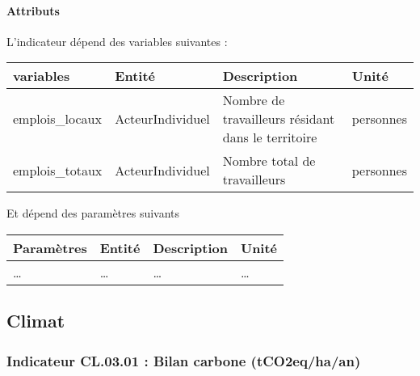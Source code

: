 \documentclass[
]{article}
\begin{document}
\paragraph{Attributs}\label{attributs-38}

L'indicateur dépend des variables suivantes :

\begin{longtable}[]{@{}
  >{\raggedright\arraybackslash}p{}
  >{\raggedright\arraybackslash}p{}
  >{\raggedright\arraybackslash}p{}
  >{\raggedright\arraybackslash}p{}@{}}
\toprule\noalign{}
\begin{minipage}[b]{\linewidth}\raggedright
\textbf{variables}
\end{minipage} & \begin{minipage}[b]{\linewidth}\raggedright
\textbf{Entité}
\end{minipage} & \begin{minipage}[b]{\linewidth}\raggedright
\textbf{Description}
\end{minipage} & \begin{minipage}[b]{\linewidth}\raggedright
\textbf{Unité}
\end{minipage} \\
\midrule\noalign{}
\endhead
\bottomrule\noalign{}
\endlastfoot
emplois\_locaux & ActeurIndividuel & Nombre de travailleurs résidant
dans le territoire & personnes \\
emplois\_totaux & ActeurIndividuel & Nombre total de travailleurs &
personnes \\
\end{longtable}

Et dépend des paramètres suivants

\begin{longtable}[]{@{}llll@{}}
\toprule\noalign{}
\textbf{Paramètres} & \textbf{Entité} & \textbf{Description} &
\textbf{Unité} \\
\midrule\noalign{}
\endhead
\bottomrule\noalign{}
\endlastfoot
\ldots{} & \ldots{} & \ldots{} & \ldots{} \\
\end{longtable}

\subsection{Climat}\label{climat}

\subsubsection{Indicateur CL.03.01 : Bilan carbone
(tCO2eq/ha/an)}\label{indicateur-cl.03.01-bilan-carbone-tco2eqhaan}
\end{document}
